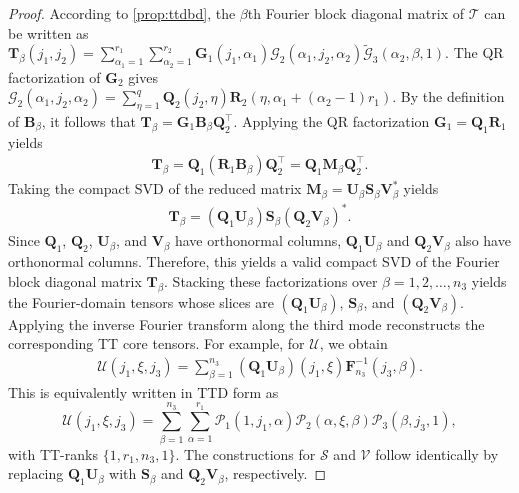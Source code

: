\documentclass[onefignum,onetabnum]{siamart250211}
\begin{document}
\begin{proof}
    According to \cref{prop:ttdbd}, the $\beta$th Fourier block diagonal matrix of $\mathscr{T}$ can be written as $\textbf{T}_\beta(j_1,j_2)
=
\sum_{\alpha_1=1}^{r_1}
\sum_{\alpha_2=1}^{r_2}
\textbf{G}_1(j_1,\alpha_1)
\mathscr{G}_2(\alpha_1,j_2,\alpha_2)
\widetilde{\mathscr{G}}_3(\alpha_2,\beta,1).$
The QR factorization of $\textbf{G}_2$ gives $\mathscr{G}_2(\alpha_1,j_2,\alpha_2)
=
\sum_{\eta=1}^{q}
\textbf{Q}_2(j_2,\eta)
\textbf{R}_2(\eta,\alpha_1+(\alpha_2-1)r_1).$
By the definition of $\textbf{B}_\beta$, it follows that $\textbf{T}_\beta
=
\textbf{G}_1\textbf{B}_\beta\textbf{Q}_2^\top.$
Applying the QR factorization $\textbf{G}_1=\textbf{Q}_1\textbf{R}_1$ yields
\begin{align*}
\textbf{T}_\beta
=
\textbf{Q}_1(\textbf{R}_1\textbf{B}_\beta)\textbf{Q}_2^\top
=
\textbf{Q}_1\textbf{M}_\beta\textbf{Q}_2^\top.
\end{align*}
Taking the compact SVD of the reduced matrix $\textbf{M}_\beta
=
\textbf{U}_\beta
\textbf{S}_\beta
\textbf{V}_\beta^{*}$ yields 
\begin{align*}
\textbf{T}_\beta
=
(\textbf{Q}_1\textbf{U}_\beta)
\textbf{S}_\beta
(\textbf{Q}_2\textbf{V}_\beta)^{*}.
\end{align*}
Since $\textbf{Q}_1$, $\textbf{Q}_2$, $\textbf{U}_\beta$, and $\textbf{V}_\beta$ have orthonormal columns, $\textbf{Q}_1\textbf{U}_\beta$ and $\textbf{Q}_2\textbf{V}_\beta$ also have orthonormal columns. Therefore, this yields a valid compact SVD of the Fourier block diagonal matrix $\textbf{T}_\beta$. Stacking these factorizations over $\beta=1,2,\dots,n_3$ yields the Fourier-domain tensors whose slices are $(\textbf{Q}_1\textbf{U}_\beta)$, $\textbf{S}_\beta$, and $(\textbf{Q}_2\textbf{V}_\beta)$. Applying the inverse Fourier transform along the third mode reconstructs the corresponding TT core tensors. 
For example, for $\mathscr{U}$, we obtain
\begin{align*}
    \mathscr{U}(j_1,\xi,j_3) = \sum_{\beta=1}^{n_3}
(\textbf{Q}_1\textbf{U}_{\beta})(j_1,\xi)
\textbf{F}_{n_3}^{-1}(j_3,\beta).
\end{align*}
This is equivalently written in TTD form as
\begin{equation*}
    \mathscr{U}(j_1,\xi,j_3) = \sum_{\beta=1}^{n_3}
\sum_{\alpha=1}^{r_1}
\mathscr{P}_1(1,j_1,\alpha)
\mathscr{P}_2(\alpha,\xi,\beta)
\mathscr{P}_3(\beta,j_3,1),
\end{equation*}
with TT-ranks $\{1,r_1,n_3,1\}$.
The constructions for $\mathscr{S}$ and $\mathscr{V}$ follow identically by replacing $\textbf{Q}_1\textbf{U}_\beta$ with $\textbf{S}_\beta$ and $\textbf{Q}_2\textbf{V}_\beta$, respectively.
\end{proof}
\end{document}
